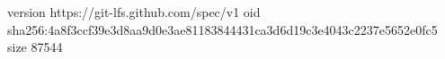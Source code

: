 version https://git-lfs.github.com/spec/v1
oid sha256:4a8f3ccf39e3d8aa9d0e3ae81183844431ca3d6d19c3e4043c2237e5652e0fc5
size 87544
